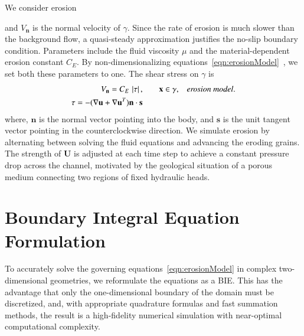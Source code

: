\documentclass[3p]{elsarticle}
\newcommand{\nn}{{\mathbf{n}}}
\renewcommand{\ss}{{\mathbf{s}}}
\newcommand{\uu}{{\mathbf{u}}}
\newcommand{\UU}{{\mathbf{U}}}
\newcommand{\xx}{{\mathbf{x}}}
\newcommand{\abs}[1]{\left| #1 \right|}
\newcommand{\Vn}{V_\nn}
\newcommand{\CE}{C_E}
\begin{document}
We consider erosion 



and $\Vn$ is the normal velocity of $\gamma$. 
Since the rate of erosion is much slower than the background flow, a quasi-steady approximation justifies the no-slip boundary condition. 
Parameters include the fluid viscosity $\mu$ and the material-dependent erosion constant $\CE$. By non-dimensionalizing equations~\eqref{eqn:erosionModel}~\citep{qua-moo2018}, we set both these parameters to one. The shear stress on $\gamma$ is
\begin{align}
\Vn = \CE \, \abs{\tau}, &\hspace{20pt} \xx \in \gamma,
      &&\mbox{\em erosion model}. \\
\tau = -(\nabla \uu + \nabla \uu^T) \nn \cdot \ss
  \label{eqn:shearStress}
\end{align}
where, $\nn$ is the normal vector pointing into the body, and $\ss$ is
the unit tangent vector pointing in the counterclockwise direction. We
simulate erosion by alternating between solving the fluid equations and
advancing the eroding grains.  The strength of $\UU$ is adjusted at each
time step to achieve a constant pressure drop across the channel,
motivated by the geological situation of a porous medium connecting two
regions of  fixed hydraulic heads.





\section{Boundary Integral Equation Formulation}
\label{sec:DLP}
To accurately solve the governing equations~\eqref{eqn:erosionModel} in
complex two-dimensional geometries, we reformulate the equations as a
BIE.  This has the advantage that only the one-dimensional boundary of
the domain must be discretized, and, with appropriate quadrature
formulas and fast summation methods, the result is a high-fidelity
numerical simulation with near-optimal computational complexity.

\end{document}
